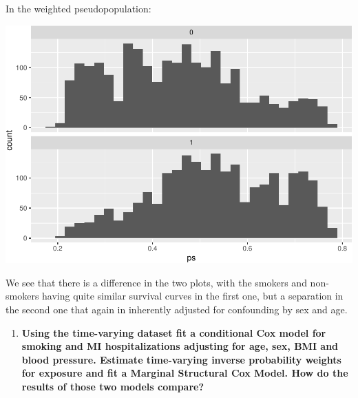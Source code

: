 \documentclass[
]{book}
\newenvironment{Shaded}{\begin{snugshade}}{\end{snugshade}}
\newcommand{\DataTypeTok}[1]{\textcolor[rgb]{0.13,0.29,0.53}{#1}}
\newcommand{\KeywordTok}[1]{\textcolor[rgb]{0.13,0.29,0.53}{\textbf{#1}}}
\newcommand{\NormalTok}[1]{#1}
\newcommand{\OperatorTok}[1]{\textcolor[rgb]{0.81,0.36,0.00}{\textbf{#1}}}
\newcommand{\StringTok}[1]{\textcolor[rgb]{0.31,0.60,0.02}{#1}}
\providecommand{\tightlist}{%
  \setlength{\itemsep}{0pt}\setlength{\parskip}{0pt}}
\begin{document}
In the weighted pseudopopulation:

\begin{Shaded}
\end{Shaded}

\includegraphics{adv_epi_analysis_files/figure-latex/unnamed-chunk-258-1.pdf}

We see that there is a difference in the two plots, with the smokers and non-smokers having quite similar survival curves in the first one, but a separation in the second one that again in inherently adjusted for confounding by sex and age.

\begin{enumerate}
\def\labelenumi{\arabic{enumi}.}
\setcounter{enumi}{2}
\tightlist
\item
  \textbf{Using the time-varying dataset fit a conditional Cox model for smoking and MI hospitalizations adjusting for age, sex, BMI and blood pressure. Estimate time-varying inverse probability weights for exposure and fit a Marginal Structural Cox Model. How do the results of those two models compare?}
\end{enumerate}
\end{document}
